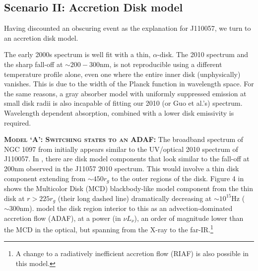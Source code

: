 \documentclass[11pt,a4paper]{article}
\begin{document}
\subsection*{Scenario II: Accretion Disk model}
Having discounted an obscuring event as the explanation for J110057,
we turn to an accretion disk model.

The early 2000s spectrum is well fit with a thin, \citet{SS73}
$\alpha$-disk. The 2010 spectrum and the sharp fall-off
at $\sim 200-300$nm, is not reproducible using a different temperature
profile alone, even one where the entire inner disk (unphysically)
vanishes. This is due to the width of the Planck function in
wavelength space.
For the same reasons, a gray absorber
model with uniformly suppressed emission at small disk radii is also
incapable of fitting our 2010 (or Guo et al.'s) spectrum. 
Wavelength dependent absorption, combined with a lower
disk emissivity is required. 

\smallskip \smallskip
\noindent
\textbf{\textsc{Model `A': Switching states to an ADAF: }}
The broadband spectrum of NGC 1097 from \citet{Nemmen2006} initially appears similar
to the UV/optical 2010 spectrum of J110057.  In \citet[][e.g., their
Figure 4]{Nemmen2006}, there are disk model components that look
similar to the fall-off at 200nm observed in the J11057 2010 spectrum.
This would involve a thin disk component extending from $\sim
450r_{g}$ to the outer regions of the disk. Figure 4 in
\citet{Nemmen2006} shows the Multicolor Disk (MCD) blackbody-like
model component from the thin disk at $r>225r_{g}$ (their long dashed
line) dramatically decreasing at $\sim 10^{15}$Hz ($\sim 300$nm).
\citet{Nemmen2006} model the disk region interior to this as 
an advection-dominated accretion flow (ADAF), at a power (in $\nu
L_{\nu}$), an order of magnitude lower than the MCD in the optical,
but spanning from the X-ray to the far-IR.\footnote{A change to 
a radiatively inefficient accretion flow (RIAF) is also possible in 
this model.}
\end{document}
